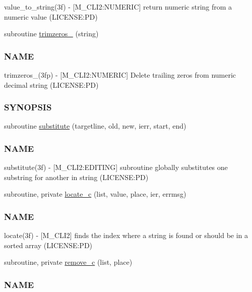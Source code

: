 \begin{DoxyCompactItemize}
\begin{DoxyCompactList}
value\+\_\+to\+\_\+string(3f) -\/ \mbox{[}M\+\_\+\+C\+L\+I2\+:N\+U\+M\+E\+R\+IC\mbox{]} return numeric string from a numeric value (L\+I\+C\+E\+N\+SE\+:PD) \end{DoxyCompactList}\item 
subroutine \mbox{\hyperlink{namespacem__cli2_a770a66475094fd80493d46498de1ebf7}{trimzeros\+\_\+}} (string)
\begin{DoxyCompactList}\small\item\em \subsubsection*{N\+A\+ME}

trimzeros\+\_\+(3fp) -\/ \mbox{[}M\+\_\+\+C\+L\+I2\+:N\+U\+M\+E\+R\+IC\mbox{]} Delete trailing zeros from numeric decimal string (L\+I\+C\+E\+N\+SE\+:PD) \subsubsection*{S\+Y\+N\+O\+P\+S\+IS}\end{DoxyCompactList}\item 
subroutine \mbox{\hyperlink{namespacem__cli2_a76af7f7c39e6755e024890d85d488704}{substitute}} (targetline, old, new, ierr, start, end)
\begin{DoxyCompactList}\small\item\em \subsubsection*{N\+A\+ME}

substitute(3f) -\/ \mbox{[}M\+\_\+\+C\+L\+I2\+:E\+D\+I\+T\+I\+NG\mbox{]} subroutine globally substitutes one substring for another in string (L\+I\+C\+E\+N\+SE\+:PD) \end{DoxyCompactList}\item 
subroutine, private \mbox{\hyperlink{namespacem__cli2_a2199778fea512efcde8778f20765643a}{locate\+\_\+c}} (list, value, place, ier, errmsg)
\begin{DoxyCompactList}\small\item\em \subsubsection*{N\+A\+ME}

locate(3f) -\/ \mbox{[}M\+\_\+\+C\+L\+I2\mbox{]} finds the index where a string is found or should be in a sorted array (L\+I\+C\+E\+N\+SE\+:PD) \end{DoxyCompactList}\item 
subroutine, private \mbox{\hyperlink{namespacem__cli2_a155af513c048d68552ec2e8fb54e1294}{remove\+\_\+c}} (list, place)
\begin{DoxyCompactList}\small\item\em \subsubsection*{N\+A\+ME}


\end{DoxyCompactList}
\end{DoxyCompactItemize}
